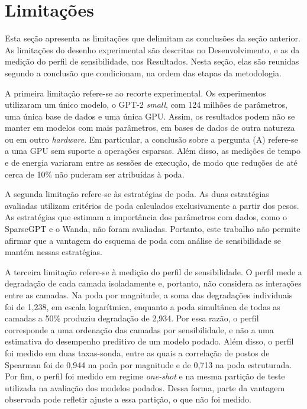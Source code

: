 \section{Limitações}\label{sec:consideracoes_limitacoes}

Esta seção apresenta as limitações que delimitam as conclusões da seção anterior. As limitações
do desenho experimental são descritas no Desenvolvimento, e as da medição do perfil de
sensibilidade, nos Resultados. Nesta seção, elas são reunidas
segundo a conclusão que condicionam, na ordem das etapas da metodologia.

A primeira limitação refere-se ao recorte experimental. Os experimentos utilizaram um único
modelo, o GPT-2 \textit{small}, com 124 milhões de parâmetros, uma única base de dados e uma
única GPU. Assim, os resultados podem não se manter em modelos com mais parâmetros, em bases de
dados de outra natureza ou em outro \textit{hardware}. Em particular, a conclusão sobre a
pergunta (A) refere-se a uma GPU sem suporte a operações esparsas. Além disso, as medições de
tempo e de energia variaram entre as sessões de execução, de modo que reduções de até cerca de
10\% não puderam ser atribuídas à poda.

A segunda limitação refere-se às estratégias de poda. As duas estratégias avaliadas utilizam
critérios de poda calculados exclusivamente a partir dos pesos. As estratégias que estimam a
importância dos parâmetros com dados, como o SparseGPT e o Wanda, não foram avaliadas.
Portanto, este trabalho não permite afirmar que a
vantagem do esquema de poda com análise de sensibilidade se mantém nessas estratégias.

A terceira limitação refere-se à medição do perfil de sensibilidade. O perfil mede a degradação
de cada camada isoladamente e, portanto, não considera as interações entre as camadas. Na poda
por magnitude, a soma das degradações individuais foi de 1,238, em escala logarítmica, enquanto
a poda simultânea de todas as camadas a 50\% produziu degradação de 2,934. Por essa razão, o
perfil corresponde a uma ordenação das camadas por sensibilidade, e não a uma estimativa do
desempenho preditivo de um modelo podado. Além disso, o perfil foi medido em duas taxas-sonda,
entre as quais a correlação de postos de Spearman foi de 0,944 na poda por magnitude e de 0,713
na poda estruturada. Por fim, o perfil foi medido em regime
\textit{one-shot} e na mesma partição de teste utilizada na avaliação dos modelos podados.
Dessa forma, parte da vantagem observada pode refletir ajuste a essa partição, o que não foi
medido.


